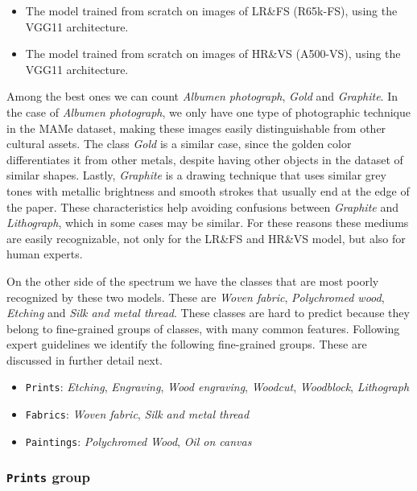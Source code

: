 \documentclass{article}
\begin{document}
\begin{itemize}
    \item The model trained from scratch on images of LR\&FS (R65k-FS), using the VGG11 architecture.
    \item The model trained from scratch on images of HR\&VS (A500-VS), using the VGG11 architecture.
\end{itemize}


Among the best ones we can count \textit{Albumen photograph}, \textit{Gold} and \textit{Graphite}. In the case of \textit{Albumen photograph}, we only have one type of photographic technique in the MAMe dataset, making these images easily distinguishable from other cultural assets. The class \textit{Gold} is a similar case, since the golden color differentiates it from other metals, despite having other objects in the dataset of similar shapes. Lastly, \textit{Graphite} is a drawing technique that uses similar grey tones with metallic brightness and smooth strokes that usually end at the edge of the paper. These characteristics help avoiding confusions between \textit{Graphite} and \textit{Lithograph}, which in some cases may be similar. For these reasons these mediums are easily recognizable, not only for the LR\&FS and HR\&VS model, but also for human experts.

On the other side of the spectrum we have the classes that are most poorly recognized by these two models. These are \textit{Woven fabric}, \textit{Polychromed wood}, \textit{Etching} and \textit{Silk and metal thread}. These classes are hard to predict because they belong to fine-grained groups of classes, with many common features. Following expert guidelines we identify the following fine-grained groups. These are discussed in further detail next.

\begin{itemize}
    \item \texttt{Prints}: \textit{Etching}, \textit{Engraving}, \textit{Wood engraving}, \textit{Woodcut}, \textit{Woodblock}, \textit{Lithograph}
    \item \texttt{Fabrics}: \textit{Woven fabric}, \textit{Silk and metal thread}
    \item \texttt{Paintings}: \textit{Polychromed Wood}, \textit{Oil on canvas}
\end{itemize}

\subsubsection{\texttt{Prints} group} \label{sec:prints-group}
\end{document}
